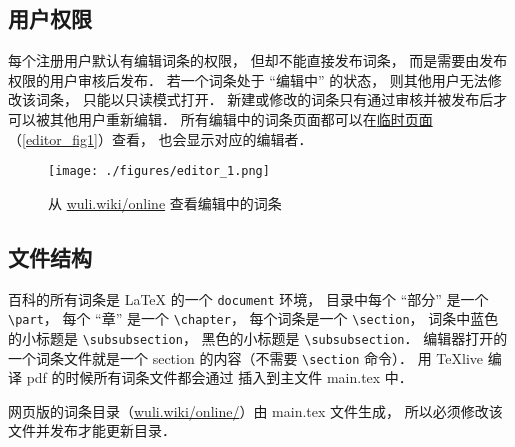 \subsection{用户权限}
每个注册用户默认有编辑词条的权限， 但却不能直接发布词条， 而是需要由发布权限的用户审核后发布． 若一个词条处于 “编辑中” 的状态， 则其他用户无法修改该词条， 只能以只读模式打开． 新建或修改的词条只有通过审核并被发布后才可以被其他用户重新编辑． 所有编辑中的词条页面都可以在\href{http://wuli.wiki/changed/changed.html}{临时页面}（\autoref{editor_fig1}）查看， 也会显示对应的编辑者．

\begin{figure}[ht]
\centering
\texttt{[image: ./figures/editor\_1.png]}
\caption{从 \href{http://wuli.wiki/online}{wuli.wiki/online} 查看编辑中的词条} \label{editor_fig1}
\end{figure}

\subsection{文件结构}

百科的所有词条是 LaTeX 的一个 \verb|document| 环境， 目录中每个 “部分” 是一个 \verb|\part|， 每个 “章” 是一个 \verb|\chapter|， 每个词条是一个 \verb|\section|， 词条中蓝色的小标题是 \verb|\subsubsection|， 黑色的小标题是 \verb|\subsubsection|． 编辑器打开的一个词条文件就是一个 section 的内容（不需要 \verb|\section| 命令）． 用 TeXlive 编译 pdf 的时候所有词条文件都会通过 \verb|| 插入到主文件 main.tex 中．

网页版的词条目录（\href{http://wuli.wiki/online/}{wuli.wiki/online/}）由 main.tex 文件生成， 所以必须修改该文件并发布才能更新目录．

